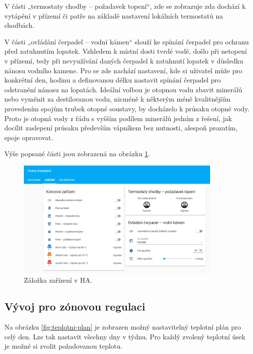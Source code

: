 V části „termostaty chodby – požadavek topení“, zde se zobrazuje zda dochází k vytápění v přízemí či patře na základě nastavení lokálních termostatů na chodbách.

V části „ovládání čerpadel – vodní kámen“ slouží ke spínání čerpadel pro ochranu před zatuhnutím lopatek. Vzhledem k místní dosti tvrdé vodě, došlo při netopení v přízemí, tedy při nevyužívání daných čerpadel k zatuhnutí lopatek v důsledku nánosu vodního kamene. Pro se zde nachází nastavení, kde si uživatel může pro konkrétní den, hodinu a definovanou délku nastavit spínání čerpadel pro odstranění nánosu na lopatách. Ideální volbou je otopnou vodu zbavit minerálů nebo vyměnit za destilovanou vodu, nicméně k některým méně kvalitnějším provedením spojům trubek otopné soustavy, by docházelo k průsaku otopné vody. Proto je otopná vody z řádu s vyšším podílem minerálů jedním z řešení, jak docílit zaslepení průsaku především vápníkem bez nutnosti, alespoň prozatím, spoje opravovat.

Výše popsané části jsou zobrazená na obrázku \ref{fig:ha-zarizeni}.




\begin{figure}[H]
    \centering
    \includegraphics[width=0.90\textwidth]{images/software-ha/ha-zarizeni.png}
    \caption{Záložka zařízení v HA.}
    \label{fig:ha-zarizeni}
\end{figure}

\subsection{Vývoj pro zónovou regulaci}

Na obrázku \ref{fig:teplotni-plan} je zobrazen možný nastavitelný teplotní plán pro celý den. Lze tak nastavit všechny dny v týdnu. Pro každý zvolený teplotní úsek je možné si zvolit požadovanou teplotu.

